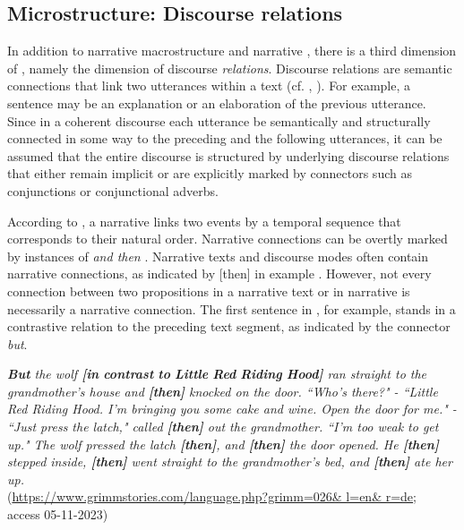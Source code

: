 \documentclass[output=paper,colorlinks,citecolor=brown]{langscibook}
\begin{document}
\subsection{Microstructure: Discourse relations} \label{sec:zeman:2.3}
In addition to narrative macrostructure and narrative , there is a third dimension of , namely the dimension of discourse \textit{relations}. Discourse relations are semantic connections that link two utterances within a text (cf. \citealt{Hobbs1979}, \citealt{AsherLascarides2003}). For example, a sentence may be an explanation or an elaboration of the previous utterance. Since in a coherent discourse each utterance be semantically and structurally connected in some way to the preceding and the following utterances, it can be assumed that the entire discourse is structured by underlying discourse relations that either remain implicit or are explicitly marked by connectors such as conjunctions or conjunctional adverbs.

According to \citet{AsherLascarides2003}, a narrative  links two events by a temporal sequence that corresponds to their natural order. Narrative connections can be overtly marked by instances of \textit{and then} \citep[200]{AsherLascarides2003}. Narrative texts and discourse modes often contain narrative connections, as indicated by [then] in example . However, not every connection between two propositions in a narrative text or in narrative  is necessarily a narrative connection. The first sentence in , for example, stands in a contrastive relation to the preceding text segment, as indicated by the connector \textit{but}. 

\ea%
\label{ex:zeman:2}
{\itshape \textbf{But} the wolf \textbf{[in} \textbf{contrast} \textbf{to} \textbf{Little} \textbf{Red} \textbf{Riding} \textbf{Hood]} ran straight to the grandmother's house and \textbf{[then]} knocked on the door. “Who's there?" - “Little Red Riding Hood. I'm bringing you some cake and wine. Open the door for me." - “Just press the latch," called \textbf{[then]} out the grandmother. “I'm too weak to get up." The wolf pressed the latch \textbf{[then]}, and \textbf{[then]} the door opened. He \textbf{[then]} stepped inside, \textbf{[then]} went straight to the grandmother's bed, and \textbf{[then]} ate her up.}\\
\hfill (\url{https://www.grimmstories.com/language.php?grimm=026\& l=en\& r=de}; \\
\hfill access 05-11-2023)\\
\z
\end{document}
